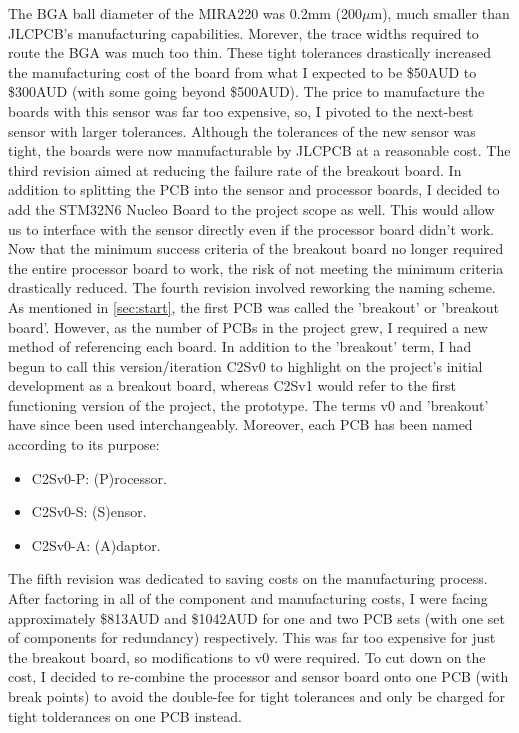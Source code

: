 \documentclass[10pt]{article}
\newcommand{\nl}{\newline \newline}
\begin{document}
The BGA ball diameter of the MIRA220 was 0.2mm (200$\mu$m), much smaller than JLCPCB's manufacturing capabilities. Morever, the trace widths required to route the BGA was much too thin. These tight tolerances drastically increased the manufacturing cost of the board from what I expected to be \$50AUD to \>\$300AUD (with some going beyond \$500AUD).
The price to manufacture the boards with this sensor was far too expensive, so, I pivoted to the next-best sensor with larger tolerances. Although the tolerances of the new sensor was tight, the boards were now manufacturable by JLCPCB at a reasonable cost.
\nl
The third revision aimed at reducing the failure rate of the breakout board. In addition to splitting the PCB into the sensor and processor boards, I decided to add the STM32N6 Nucleo Board to the project scope as well. This would allow us to interface with the sensor directly even if the processor board didn't work.
Now that the minimum success criteria of the breakout board no longer required the entire processor board to work, the risk of not meeting the minimum criteria drastically reduced.
\nl
The fourth revision involved reworking the naming scheme. As mentioned in \autoref{sec:start}, the first PCB was called the 'breakout' or 'breakout board'. However, as the number of PCBs in the project grew, I required a new method of referencing each board.
In addition to the 'breakout' term, I had begun to call this version/iteration C2Sv0 to highlight on the project's initial development as a breakout board, whereas C2Sv1 would refer to the first functioning version of the project, the prototype. The terms v0 and 'breakout' have since been used interchangeably.
Moreover, each PCB has been named according to its purpose:
\begin{itemize}
    \item C2Sv0-P: (P)rocessor.
    \item C2Sv0-S: (S)ensor.
    \item C2Sv0-A: (A)daptor.
\end{itemize}
The fifth revision was dedicated to saving costs on the manufacturing process. After factoring in all of the component and manufacturing costs, I were facing approximately \$813AUD and \$1042AUD for one and two PCB sets (with one set of components for redundancy) respectively.
This was far too expensive for just the breakout board, so modifications to v0 were required. To cut down on the cost, I decided to re-combine the processor and sensor board onto one PCB (with break points) to avoid the double-fee for tight tolerances and only be charged for tight tolderances on one PCB instead.
\end{document}
